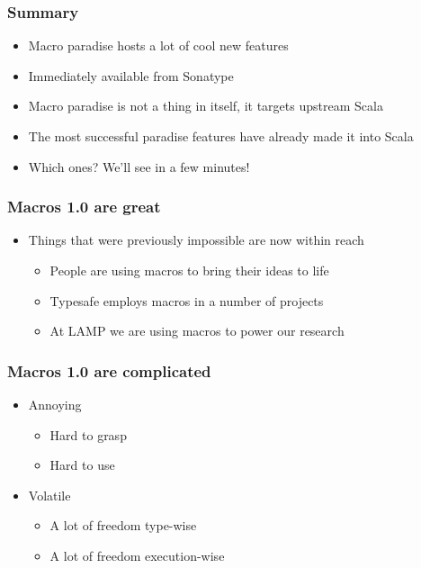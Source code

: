 \documentclass[svgnames,hyperref={bookmarks=false}]{beamer}
\begin{document}
\begin{frame}[fragile]
\frametitle{Summary}

\begin{itemize}
\item Macro paradise hosts a lot of cool new features
\item Immediately available from Sonatype
\item Macro paradise is not a thing in itself, it targets upstream Scala
\item The most successful paradise features have already made it into Scala
\item Which ones? We'll see in a few minutes!
\end{itemize}
\end{frame}

\begin{frame}[fragile]
\frametitle{}

\vskip40pt
\begin{center}
\end{center}
\end{frame}

\begin{frame}[fragile]
\frametitle{Macros 1.0 are great}

\begin{itemize}
\item Things that were previously impossible are now within reach
\begin{itemize}
\item People are using macros to bring their ideas to life
\item Typesafe employs macros in a number of projects
\item At LAMP we are using macros to power our research
\end{itemize}
\end{itemize}
\end{frame}

\begin{frame}[fragile]
\frametitle{Macros 1.0 are complicated}

\begin{itemize}
\item Annoying
\begin{itemize}
\item Hard to grasp
\item Hard to use
\end{itemize}
\vskip15pt
\item Volatile
\begin{itemize}
\item A lot of freedom type-wise
\item A lot of freedom execution-wise
\end{itemize}
\end{itemize}
\end{frame}
\end{document}
